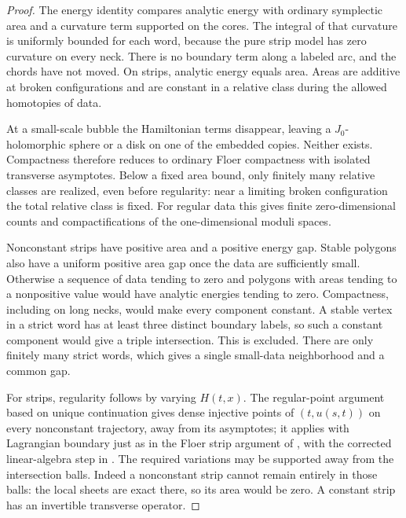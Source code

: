 \documentclass[11pt]{article}
\numberwithin{equation}{section}
\theoremstyle{definition}
\theoremstyle{remark}
\begin{document}
\begin{proof}
The energy identity compares analytic energy with ordinary symplectic
area and a curvature term supported on the cores.  The integral of
that curvature is uniformly bounded for each word, because the pure
strip model has zero curvature on every neck.  There is no boundary
term along a labeled arc, and the chords have not moved.  On strips,
analytic energy equals area.  Areas are additive at broken
configurations and are constant in a relative class during the
allowed homotopies of data.

At a small-scale bubble the Hamiltonian terms disappear, leaving a
$J_0$-holomorphic sphere or a disk on one of the embedded copies.
Neither exists.  Compactness therefore reduces to ordinary Floer
compactness with isolated transverse asymptotes.  Below a fixed area
bound, only finitely many relative classes are realized, even before
regularity: near a limiting broken configuration the total relative
class is fixed.  For regular data this gives finite zero-dimensional
counts and compactifications of the one-dimensional moduli spaces.

Nonconstant strips have positive area and a positive energy gap.
Stable polygons also have a uniform positive area gap once the data
are sufficiently small.  Otherwise a sequence of data tending to
zero and polygons with areas tending to a nonpositive value would
have analytic energies tending to zero.  Compactness, including on
long necks, would make every component constant.  A stable vertex in
a strict word has at least three distinct boundary labels, so such
a constant component would give a triple intersection.  This is
excluded.  There are only finitely many strict words, which gives a
single small-data neighborhood and a common gap.

For strips, regularity follows by varying $H(t,x)$.  The regular-point
argument based on unique continuation gives dense injective points
of $(t,u(s,t))$ on every nonconstant trajectory, away from its
asymptotes; it applies with Lagrangian boundary just as in the Floer
strip argument of \cite{FloerHoferSalamon}, with the corrected
linear-algebra step in \cite{FloerHoferSalamonErratum}.
The required variations
may be supported away from the intersection balls.  Indeed a
nonconstant strip cannot remain entirely in those balls: the local
sheets are exact there, so its area would be zero.  A constant strip
has an invertible transverse operator.


\end{proof}
\end{document}
